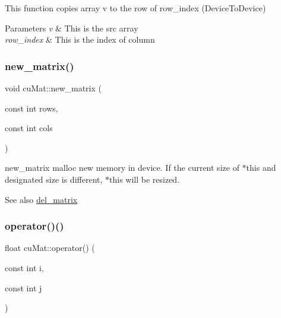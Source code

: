 This function copies array v to the row of row\+\_\+index (Device\+To\+Device) 


\begin{DoxyParams}{Parameters}
{\em v} & This is the src array \\
\hline
{\em row\+\_\+index} & This is the index of column \\
\hline
\end{DoxyParams}
\mbox{\label{classcuMat_a9029f495582d01345ab6513a670e5222}} 
\subsubsection{\texorpdfstring{new\+\_\+matrix()}{new\_matrix()}}
{\footnotesize\ttfamily void cu\+Mat\+::new\+\_\+matrix (\begin{DoxyParamCaption}\item[{const int}]{rows,  }\item[{const int}]{cols }\end{DoxyParamCaption})\hspace{0.3cm}{\ttfamily [inline]}}



new\+\_\+matrix malloc new memory in device. If the current size of $\ast$this and designated size is different, $\ast$this will be resized. 

\begin{DoxySeeAlso}{See also}
\mbox{\hyperlink{classcuMat_a76fc37b5688d34d9c5b4f55957b8d8ab}{del\+\_\+matrix}} 
\end{DoxySeeAlso}
\mbox{\label{classcuMat_a52ee337354d10e2991f214aff8977824}} 
\subsubsection{\texorpdfstring{operator()()}{operator()()}}
{\footnotesize\ttfamily float cu\+Mat\+::operator() (\begin{DoxyParamCaption}\item[{const int}]{i,  }\item[{const int}]{j }\end{DoxyParamCaption})\hspace{0.3cm}{\ttfamily [inline]}}



